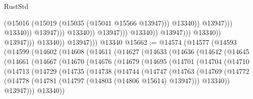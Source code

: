 \begin{lexlean}{RustStd}
\begin{coremodule}
                                                              (@15016
                                                                (@15019
                                                                  (@15035 (@15041 @15566 @13947)))
                                                                @13340))
                                                            @13947)))
                                                      @13340))
                                                  @13947)))
                                            @13340))
                                        @13947)))
                                  @13340))
                              @13947)))
                        @13340))
                    @13947)))
              @13340))
          @13947)))
    @13340
@15662 := @14574
    (@14577
      (@14593
        (@14599
          (@14602
            (@14608
              (@14611
                (@14627
                  (@14633
                    (@14636
                      (@14642
                        (@14645
                          (@14661
                            (@14667
                              (@14670
                                (@14676
                                  (@14679
                                    (@14695
                                      (@14701
                                        (@14704
                                          (@14710
                                            (@14713
                                              (@14729
                                                (@14735
                                                  (@14738
                                                    (@14744
                                                      (@14747
                                                        (@14763
                                                          (@14769
                                                            (@14772
                                                              (@14778
                                                                (@14781
                                                                  (@14797
                                                                    (@14803
                                                                      (@14806 @15614)
                                                                      @13947)))
                                                                @13340))
                                                            @13947)))
                                                      @13340))

\end{coremodule}
\end{lexlean}
